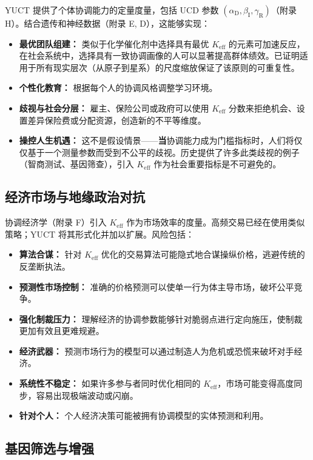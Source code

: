 \documentclass[12pt,a4paper]{article}
\theoremstyle{remark}
\newcommand{\Keff}{K_{\mathrm{eff}}}
\newcommand{\alD}{\alpha_{\mathrm{D}}}
\newcommand{\beI}{\beta_{\mathrm{I}}}
\newcommand{\gaR}{\gamma_{\mathrm{R}}}
\begin{document}
	YUCT 提供了个体协调能力的定量度量，包括 UCD 参数 \((\alD,\beI,\gaR)\)（附录 H）。结合遗传和神经数据（附录 E, D），这能够实现：
	\begin{itemize}[leftmargin=*]
		\item \textbf{最优团队组建：} 类似于化学催化剂中选择具有最优 \(\Keff\) 的元素可加速反应，在社会系统中，选择具有一致协调画像的人可以显著提高群体绩效。已证明适用于所有现实层次（从原子到星系）的尺度缩放保证了该原则的可重复性。
		\item \textbf{个性化教育：} 根据每个人的协调风格调整学习环境。
		\item \textbf{歧视与社会分层：} 雇主、保险公司或政府可以使用 \(\Keff\) 分数来拒绝机会、设置差异保险费或分配资源，创造新的不平等维度。
		\item \textbf{操控人生机遇：} 这不是假设情景——\textbf{当}协调能力成为门槛指标时，人们将仅仅基于一个测量参数而受到不公平的歧视。历史提供了许多此类歧视的例子（智商测试、基因筛查），引入 \(\Keff\) 作为社会重要指标是不可避免的。
	\end{itemize}
	
	\subsection{经济市场与地缘政治对抗}
	\label{subsec:econ}
	
	协调经济学（附录 F）引入 \(\Keff\) 作为市场效率的度量。高频交易已经在使用类似策略；YUCT 将其形式化并加以扩展。风险包括：
	\begin{itemize}[leftmargin=*]
		\item \textbf{算法合谋：} 针对 \(\Keff\) 优化的交易算法可能隐式地合谋操纵价格，逃避传统的反垄断执法。
		\item \textbf{预测性市场控制：} 准确的价格预测可以使单一行为体主导市场，破坏公平竞争。
		\item \textbf{强化制裁压力：} 理解经济的协调参数能够针对脆弱点进行定向施压，使制裁更加有效且更难规避。
		\item \textbf{经济武器：} 预测市场行为的模型可以通过制造人为危机或恐慌来破坏对手经济。
		\item \textbf{系统性不稳定：} 如果许多参与者同时优化相同的 \(\Keff\)，市场可能变得高度同步，容易出现极端波动或闪崩。
		\item \textbf{针对个人：} 个人经济决策可能被拥有协调模型的实体预测和利用。
	\end{itemize}
	
	\subsection{基因筛选与增强}
	\label{subsec:genetic}
	
\end{document}
